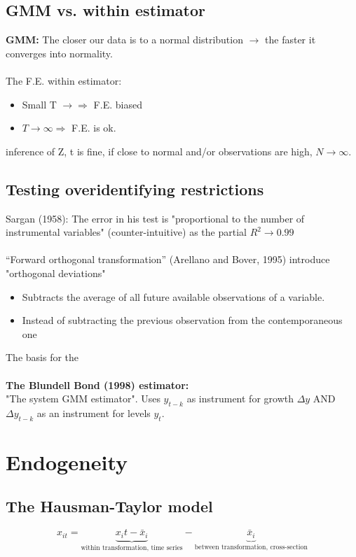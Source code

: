 \begin{multicols}{2}
 \subsection{GMM vs. within estimator}
 \textbf{GMM:} The closer our data is to a normal distribution $\rightarrow$ the faster it converges into normality.
 \\ \\
 The F.E. within estimator:
 \begin{itemize}
  \item Small T $\rightarrow\Rightarrow$ F.E. biased
  \item $T\rightarrow\infty\Rightarrow$ F.E. is ok.
 \end{itemize}

 inference of Z, t is fine, if close to normal and/or observations are high, $N\rightarrow\infty$.

 \subsection{Testing overidentifying restrictions}
Sargan (1958): The error in his test is "proportional to the number of instrumental variables" (counter-intuitive) as the partial $R^2\rightarrow 0.99$
\\ \\
“Forward orthogonal transformation” (Arellano and Bover, 1995) introduce "orthogonal deviations"
 \begin{itemize}
   \item Subtracts the average of all future available observations of a variable.
   \item Instead of subtracting the previous observation from the contemporaneous one
 \end{itemize}
 The basis for the\\
 \\
\textbf{The Blundell Bond (1998) estimator:}\\
"The system GMM estimator". Uses $y_{t-k}$ as instrument for growth $\Delta y$ AND $\Delta y_{t-k}$ as an instrument for levels $y_t$.

\end{multicols}


\section{Endogeneity}

\subsection{The Hausman-Taylor model}
\begin{equation*}
  x_{it} = \underbrace{x_it-\bar{x}_i}_\text{within transformation, time series} - \underbrace{\bar{x}_i}_\text{between transformation, cross-section}
\end{equation*}






